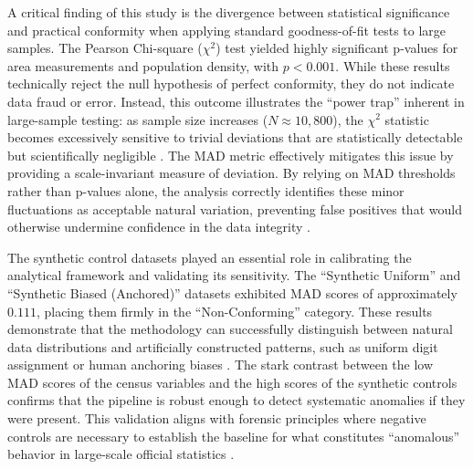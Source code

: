 \documentclass[11pt,a4paper]{article}
\begin{document}
A critical finding of this study is the divergence between statistical significance and practical conformity when applying standard goodness-of-fit tests to large samples. The Pearson Chi-square ($\chi^2$) test yielded highly significant p-values for area measurements and population density, with $p < 0.001$. While these results technically reject the null hypothesis of perfect conformity, they do not indicate data fraud or error. Instead, this outcome illustrates the ``power trap'' inherent in large-sample testing: as sample size increases ($N \approx 10{,}800$), the $\chi^2$ statistic becomes excessively sensitive to trivial deviations that are statistically detectable but scientifically negligible \cite{Cerqueti2021SomeNT}. The MAD metric effectively mitigates this issue by providing a scale-invariant measure of deviation. By relying on MAD thresholds rather than p-values alone, the analysis correctly identifies these minor fluctuations as acceptable natural variation, preventing false positives that would otherwise undermine confidence in the data integrity \cite{Kossler2024SomeNI}.

The synthetic control datasets played an essential role in calibrating the analytical framework and validating its sensitivity. The ``Synthetic Uniform'' and ``Synthetic Biased (Anchored)'' datasets exhibited MAD scores of approximately $0.111$, placing them firmly in the ``Non-Conforming'' category. These results demonstrate that the methodology can successfully distinguish between natural data distributions and artificially constructed patterns, such as uniform digit assignment or human anchoring biases \cite{Petras2025DetectingBL}. The stark contrast between the low MAD scores of the census variables and the high scores of the synthetic controls confirms that the pipeline is robust enough to detect systematic anomalies if they were present. This validation aligns with forensic principles where negative controls are necessary to establish the baseline for what constitutes ``anomalous'' behavior in large-scale official statistics \cite{Schafer2005AutomatieIO}.
\end{document}
